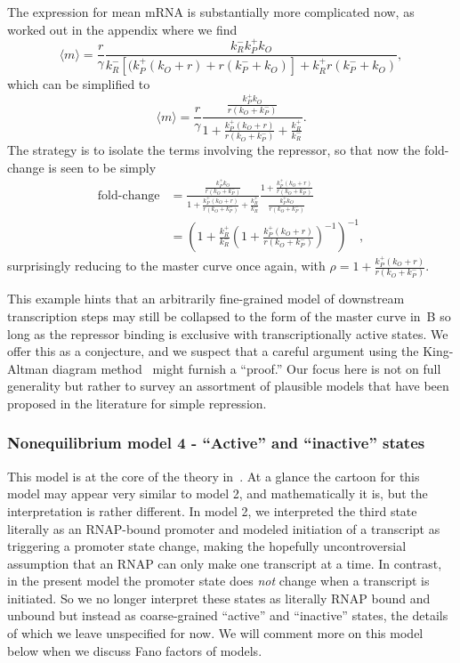 The expression for mean mRNA is substantially more complicated now, as worked
out in the appendix where we find
\begin{equation}
\langle m\rangle = \frac{r}{\gamma}
        \frac{k_R^- k_P^+ k_O}
        {k_R^- [(k_P^+ (k_O + r) + r(k_P^- + k_O)] + k_R^+ r(k_P^- + k_O)},
\end{equation}
which can be simplified to
\begin{equation}
\langle m\rangle
= \frac{r}{\gamma}
\frac{\frac{k_P^+ k_O}{r(k_O + k_P^-)}}
        {1 + \frac{k_P^+ (k_O + r)}{r(k_O + k_P^-)} + \frac{k_R^+}{k_R^-}}.
\end{equation}
The strategy is to isolate the terms involving the repressor, so that now the
fold-change is seen to be simply
\begin{align}
\text{fold-change}
&= \frac{\frac{k_P^+ k_O}{r(k_O + k_P^-)}}
        {1 + \frac{k_P^+ (k_O + r)}{r(k_O + k_P^-)} + \frac{k_R^+}{k_R^-}}
        \frac{1 + \frac{k_P^+ (k_O + r)}{r(k_O + k_P^-)}}
                {\frac{k_P^+ k_O}{r(k_O + k_P^-)}}
\\
&= \left(
        1 + \frac{k_R^+}{k_R^-}
        \left(1 + \frac{k_P^+ (k_O + r)}{r(k_O + k_P^-)}\right)^{-1}
\right)^{-1},
\end{align}
surprisingly reducing to the master curve once again, with $\rho = 1 +
\frac{k_P^+ (k_O + r)}{r(k_O + k_P^-)}$.

This example hints that an arbitrarily fine-grained model of downstream
transcription steps may still be collapsed to the form of the master curve
in~B so long as the repressor binding is exclusive with
transcriptionally active states. We offer this as a conjecture, and we suspect
that a careful argument using the King-Altman diagram method~\cite{King1956,
Hill1966} might furnish a ``proof.'' Our focus here is not on full generality
but rather to survey an assortment of plausible models that have been proposed
in the literature for simple repression.

\subsubsection{Nonequilibrium model 4 - ``Active'' and ``inactive'' states}
This model is at the core of the theory in~\cite{Razo-Mejia2020}. At a glance
the cartoon for this model may appear very similar to model 2, and
mathematically it is, but the interpretation is rather different. In model 2, we
interpreted the third state literally as an RNAP-bound promoter and modeled
initiation of a transcript as triggering a promoter state change, making the
hopefully uncontroversial assumption that an RNAP can only make one transcript
at a time. In contrast, in the present model the promoter state does
\textit{not} change when a transcript is initiated. So we no longer interpret
these states as literally RNAP bound and unbound but instead as coarse-grained
``active'' and ``inactive'' states, the details of which we leave unspecified
for now. We will comment more on this model below when we discuss Fano factors
of models.


